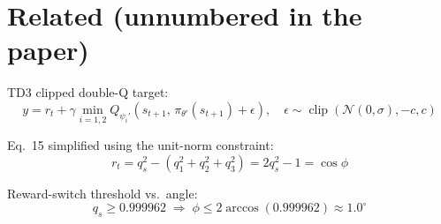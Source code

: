 \documentclass{article}
\begin{document}
\section*{Related (unnumbered in the paper)}

TD3 clipped double-Q target:
\begin{equation*}
y = r_t + \gamma \min_{i=1,2} Q_{\psi_i'}\!\left(s_{t+1},\, \pi_{\theta'}(s_{t+1}) + \epsilon\right),
\quad \epsilon \sim \operatorname{clip}(\mathcal{N}(0,\sigma), -c, c)
\end{equation*}

Eq.~15 simplified using the unit-norm constraint:
\begin{equation*}
r_t = q_s^2 - (q_1^2 + q_2^2 + q_3^2) = 2q_s^2 - 1 = \cos\phi
\end{equation*}

Reward-switch threshold vs.\ angle:
\begin{equation*}
q_s \ge 0.999962 \;\Rightarrow\; \phi \le 2\arccos(0.999962) \approx 1.0^\circ
\end{equation*}
\end{document}

